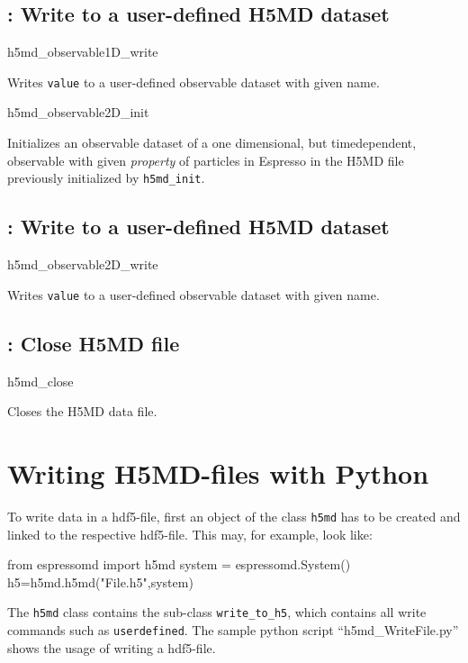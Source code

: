 \subsection{: Write to a user-defined H5MD
dataset}

\begin{essyntax}
h5md_observable1D_write  
\end{essyntax}
Writes \texttt{value} to a user-defined observable dataset with given name.


\begin{essyntax}
h5md_observable2D_init 
\end{essyntax}
Initializes an observable dataset of a one dimensional, but timedependent, 
observable with given \textit{property} of particles in Espresso in the H5MD file previously
initialized by \texttt{h5md_init}.

\subsection{: Write to a user-defined H5MD
dataset}

\begin{essyntax}
h5md_observable2D_write  
\end{essyntax}
Writes \texttt{value} to a user-defined observable dataset with given name.

\subsection{: Close H5MD file}

\begin{essyntax}
h5md_close
\end{essyntax}
Closes the H5MD data file.


\section{Writing H5MD-files with Python}
To write data in a hdf5-file, first an object of the class \texttt{h5md} has to be created and linked to the respective hdf5-file. This may, for example, look like:
\begin{pycode}
from espressomd import h5md
system = espressomd.System()
h5=h5md.h5md("File.h5",system)
\end{pycode}
The \texttt{h5md} class contains the sub-class \texttt{write_to_h5}, which contains all write commands such as \texttt{userdefined}. The sample python script ``h5md_WriteFile.py'' shows the usage of writing a hdf5-file.

